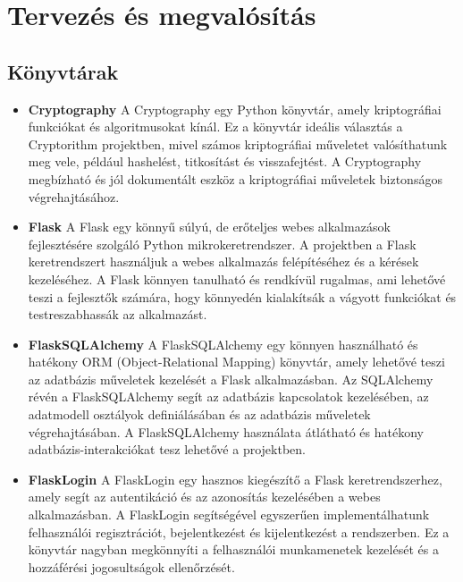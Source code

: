 \chapter{Tervezés és megvalósítás}
\section {Könyvtárak}

\begin{itemize}
  	\item\textbf{Cryptography}
A Cryptography egy Python könyvtár, amely kriptográfiai funkciókat és algoritmusokat kínál. Ez a könyvtár ideális választás a Cryptorithm projektben, mivel számos kriptográfiai műveletet valósíthatunk meg vele, például hashelést, titkosítást és visszafejtést. A Cryptography megbízható és jól dokumentált eszköz a kriptográfiai műveletek biztonságos végrehajtásához.

 	 \item\textbf{Flask}
A Flask egy könnyű súlyú, de erőteljes webes alkalmazások fejlesztésére szolgáló Python mikrokeretrendszer. A projektben a Flask keretrendszert használjuk a webes alkalmazás felépítéséhez és a kérések kezeléséhez. A Flask könnyen tanulható és rendkívül rugalmas, ami lehetővé teszi a fejlesztők számára, hogy könnyedén kialakítsák a vágyott funkciókat és testreszabhassák az alkalmazást.

 	 \item\textbf{FlaskSQLAlchemy}
A FlaskSQLAlchemy egy könnyen használható és hatékony ORM (Object-Relational Mapping) könyvtár, amely lehetővé teszi az adatbázis műveletek kezelését a Flask alkalmazásban. Az SQLAlchemy révén a FlaskSQLAlchemy segít az adatbázis kapcsolatok kezelésében, az adatmodell osztályok definiálásában és az adatbázis műveletek végrehajtásában. A FlaskSQLAlchemy használata átlátható és hatékony adatbázis-interakciókat tesz lehetővé a projektben.

 	 \item\textbf{FlaskLogin}
A FlaskLogin egy hasznos kiegészítő a Flask keretrendszerhez, amely segít az autentikáció és az azonosítás kezelésében a webes alkalmazásban. A FlaskLogin segítségével egyszerűen implementálhatunk felhasználói regisztrációt, bejelentkezést és kijelentkezést a rendszerben. Ez a könyvtár nagyban megkönnyíti a felhasználói munkamenetek kezelését és a hozzáférési jogosultságok ellenőrzését.


\end{itemize}
